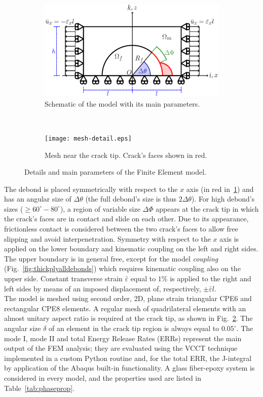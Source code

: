 \documentclass[review]{elsarticle}
\begin{document}
\begin{figure}[!h]
\centering
    \begin{subfigure}[b]{0.55\textwidth}
        \includegraphics[width=\textwidth]{RUC.pdf}
        \caption{Schematic of the model with its main parameters.}\label{subfig:modelschem}
    \end{subfigure} ~
    \begin{subfigure}[b]{0.4\textwidth}
        \texttt{[image: mesh-detail.eps]}
        \caption{Mesh near the crack tip. Crack's faces shown in red.}\label{subfig:meshdetail}
    \end{subfigure}

\caption{Details and main parameters of the Finite Element model.}\label{fig:FEmodel}
\end{figure}

The debond is placed symmetrically with respect to the $x$ axis (in red in~\ref{subfig:modelschem}) and has an angular size of $\Delta\theta$ (the full debond's size is thus $2\Delta\theta$). For high debond's sizes ($\geq 60^{\circ}-80^{\circ}$), a region of variable size $\Delta\Phi$ appears at the crack tip in which the crack's faces are in contact and slide on each other. Due to its appearance, frictionless contact is considered between the two crack's faces to allow free slipping and avoid interpenetration. Symmetry with respect to the $x$ axis is applied on the lower boundary and kinematic coupling on the left and right sides. The upper boundary is in general free, except for the model \textit{coupling} (Fig.~\ref{fig:thickplyalldebonds}) which requires kinematic coupling also on the upper side. Constant transverse strain $\bar{\varepsilon}$ equal to $1\%$ is applied to the right and left sides by means of an imposed displacement of, respectively, $\pm\bar{\varepsilon}l$.\\
The model is meshed using second order, 2D, plane strain triangular CPE6 and rectangular CPE8 elements. A regular mesh of quadrilateral elements with an almost unitary aspect ratio is required at the crack tip, as shown in Fig.~\ref{subfig:meshdetail}. The angular size $\delta$ of an element in the crack tip region is always equal to $0.05^{\circ}$. The mode I, mode II and total Energy Release Rates (ERRs) represent the main output of the FEM analysis; they are evaluated using the VCCT technique implemented in a custom Python routine and, for the total ERR, the J-integral by application of the Abaqus built-in functionality. A glass fiber-epoxy system is considered in every model, and the properties used are listed in Table~\ref{tab:phaseprop}.
\end{document}
